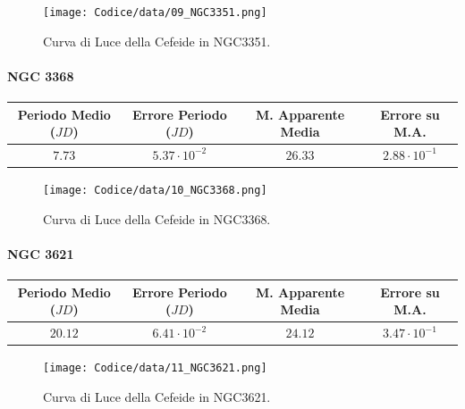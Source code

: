 \documentclass{article}
\newcommand{\e}[1]{\cdot 10^{#1}} %
\begin{document}
\begin{figure}[H]
  \centering
  \texttt{[image: Codice/data/09\_NGC3351.png]}
  \caption{Curva di Luce della Cefeide in NGC3351.}
\end{figure}

\paragraph{NGC 3368}
\begin{center}
  \begin{tabular}{cccc}
  \toprule
  Periodo Medio ($JD$) & Errore Periodo ($JD$) & M. Apparente Media &
                                                                  Errore
                                                                      su
                                                                      M.A. \\
  \midrule
  $7.73$ & $5.37\e{-2}$ & $26.33$ & $2.88\e{-1}$ \\
  \bottomrule
 \end{tabular}
\end{center}

\begin{figure}[H]
  \centering
  \texttt{[image: Codice/data/10\_NGC3368.png]}
  \caption{Curva di Luce della Cefeide in NGC3368.}
\end{figure}

\paragraph{NGC 3621}
\begin{center}
  \begin{tabular}{cccc}
  \toprule
  Periodo Medio ($JD$) & Errore Periodo ($JD$) & M. Apparente Media &
                                                                  Errore
                                                                      su
                                                                      M.A. \\
  \midrule
  $20.12$ & $6.41\e{-2}$ & $24.12$ & $3.47\e{-1}$ \\
  \bottomrule
 \end{tabular}
\end{center}

\begin{figure}[H]
  \centering
  \texttt{[image: Codice/data/11\_NGC3621.png]}
  \caption{Curva di Luce della Cefeide in NGC3621.}
\end{figure}
\end{document}
